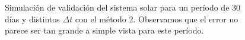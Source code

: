 \begin{figure}
{	\label{fig:ej2_m2_30_12}
	}
	\caption{
		Simulación de validación del sistema solar para un período de 30 días y distintos $\Delta t$
		con el método 2.
		Observamos que el error no parece ser tan grande a simple vista para este período.
	}
	\label{ fig:res_ej2_m2_30 }
\end{figure}
